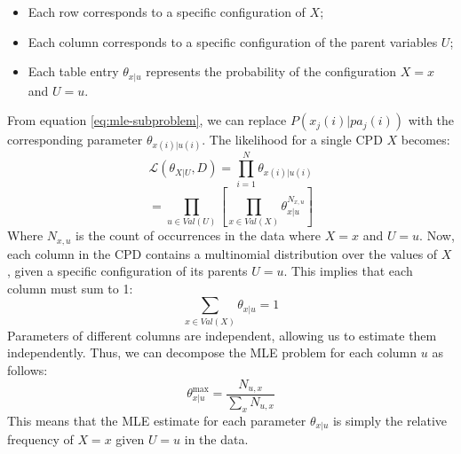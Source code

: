 \begin{itemize}
    \item Each row corresponds to a specific configuration of $X$;
    \item Each column corresponds to a specific configuration of the parent variables $U$;
    \item Each table entry $\theta_{x|u}$ represents the probability of the configuration $X = x$ and $U = u$.
\end{itemize}
From equation \ref{eq:mle-subproblem}, we can replace $P(x_j(i) | pa_j(i))$ with the corresponding parameter 
$\theta_{x(i)|u(i)}$. The likelihood for a single CPD $X$ becomes:
\begin{equation*}
    \mathcal{L}(\theta_{X|U}, D) = \prod_{i=1}^{N} \theta_{x(i)|u(i)}
\end{equation*}
\begin{equation*}
    = \prod_{u \in Val(U)} \left[\prod_{x \in Val(X)} \theta_{x|u}^{N_{x,u}}\right]
\end{equation*}
Where $N_{x,u}$ is the count of occurrences in the data where $X = x$ and $U = u$.
Now, each column in the CPD contains a multinomial distribution over the values of $X$, 
given a specific configuration of its parents $U = u$.
This implies that each column must sum to 1:
\[\sum_{x \in Val(X)} \theta_{x|u} = 1\]
Parameters of different columns are independent, allowing us to estimate them independently.
Thus, we can decompose the MLE problem for each column $u$ as follows:
\begin{equation*}
    \theta_{x|u}^{\max} = \frac{N_{u,x}}{\sum_{x} N_{u,x}}
\end{equation*}
This means that the MLE estimate for each parameter $\theta_{x|u}$ is simply the relative frequency of $X = x$
given $U = u$ in the data.

